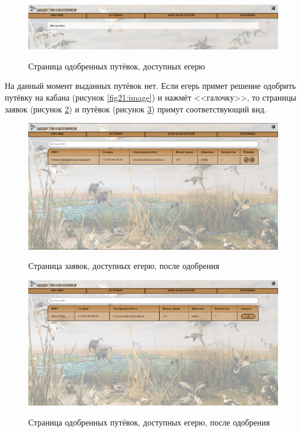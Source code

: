 	\begin{figure}[h]
		\centering
		\begin{center}
			{\includegraphics[scale=0.34]{schemes/screens/vouchers_huntsman2.png}}
			\caption{Страница одобренных путёвок, доступных егерю}
			\label{fig23:image}
		\end{center}
	\end{figure}
	\newpage

	На данный момент выданных путёвок нет. Если егерь примет решение одобрить путёвку на кабана (рисунок \ref{fig21:image}) и нажмёт <<галочку>>, то страницы заявок (рисунок \ref{fig24:image}) и путёвок (рисунок \ref{fig25:image}) примут соответствующий вид.
	
	\begin{figure}[h!]
		\centering
		\begin{center}
			{\includegraphics[scale=0.34]{schemes/screens/requests_huntsman_add.png}}
			\caption{Страница заявок, доступных егерю, после одобрения}
			\label{fig24:image}
		\end{center}
	\end{figure} 

	\begin{figure}[pt!]
		\centering
		\begin{center}
			{\includegraphics[scale=0.34]{schemes/screens/vouchers_huntsman_add.png}}
			\caption{Страница одобренных путёвок, доступных егерю, после одобрения}
			\label{fig25:image}
		\end{center}
	\end{figure} 
	\newpage

